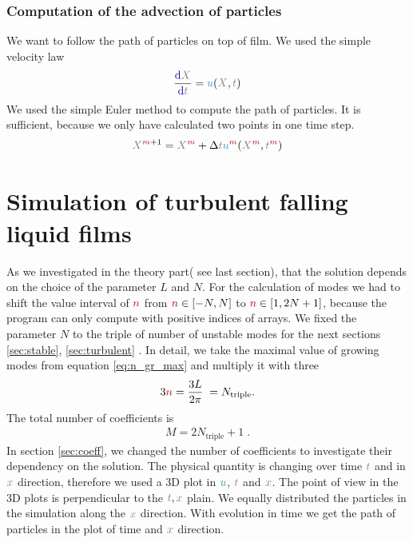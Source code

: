 \documentclass[10pt,fleqn, %
reqno,a4paper]{article}
\makeatletter
\def\mathcolor#1#{\@mathcolor{#1}}
\def\@mathcolor#1#2#3{%
        \protect\leavevmode
        \begingroup\color#1{#2}#3\endgroup
}
\newcommand{\nx}{\mathcolor{gray}{x}}
\newcommand{\nX}{\mathcolor{gray}{X}}
\newcommand{\nt}{\mathcolor{gray}{t}}
\newcommand{\nnu}{\mathcolor{cyan!70!black}{u}}
\newcommand{\nm}{\mathcolor{red!70!black}{m}}
\newcommand{\nn}{\mathcolor{red!70!black}{n}}
\newcommand{\dif}{\mathrm{\mathcolor{blue!70!black}{d } } }
\makeatother
\begin{document}
\subsubsection{Computation of the advection of particles}
We want to follow the path of particles on top of film. We used the simple velocity law
\begin{align}
        \frac{\dif \nX}{\dif \nt} = \nnu (\nX, \nt) \label{eq:v_law}
\end{align}
We used the simple Euler method to compute the path of particles. It is sufficient, because we only have calculated two points in one time step. 
\begin{align}
\nX ^{\nm+1} = \nX ^{\nm} + \Delta \nt \nnu^{\nm} (\nX^{\nm}, \nt^{\nm}) \label{eq:euler}
\end{align}

\newpage

\section{Simulation of turbulent falling liquid films}
As we investigated in the theory part( see last section), that the solution depends on the choice of the parameter $ L $ and $ N $. 
For the calculation of modes we had to shift the value interval of $ \nn $ from $ \nn \in [-N,N] $ to $ \nn \in [1,2N+1] $, because the program can only compute with positive indices of arrays. 
We fixed the parameter $ N $ to the triple of number of unstable modes for the next sections \ref{sec:stable}, \ref{sec:turbulent} .
In detail, we take the maximal value of growing modes from equation \eqref{eq:n_gr_max} and multiply it with three
\begin{align*}
        3 \nn = \frac{3L}{2\pi} \; = N_{\mathrm{triple}}.
\end{align*}
The total number of coefficients is 
\begin{align*}
        M = 2N_{\mathrm{triple}} + 1 \; .
\end{align*}
In section \ref{sec:coeff}, we changed the number of coefficients to investigate their dependency on the solution. 
The physical quantity is changing over time $ \nt $ and in $ \nx $ direction, therefore we used a 3D plot in $ \nnu $, $ \nt $ and $ \nx $. 
The point of view in the 3D plots is perpendicular to the $ \nt, \nx $ plain.
We equally distributed the particles in the simulation along the $ \nx $ direction.
With evolution in time we get the path of particles in the plot of time and $ \nx $ direction.  
 
\end{document}
